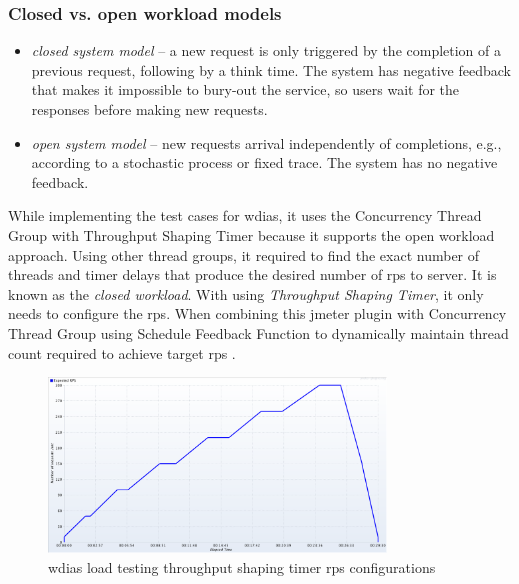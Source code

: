 \subsubsection{Closed vs. open workload models}
\label{subse:closed_vs_open_workload}
\begin{itemize}
    \item \emph{closed system model} \cite{Haggett1998AnWales} -- a new request is only triggered by the completion of a previous request, following by a think time. The system has negative feedback that makes it impossible to bury-out the service, so users wait for the responses before making new requests.
    \item \emph{open system model} -- new requests arrival independently of completions, e.g., according to a stochastic process or fixed trace. The system has no negative feedback.
\end{itemize}
While implementing the test cases for \acrshort{wdias}, it uses the Concurrency Thread Group with Throughput Shaping Timer because it supports the open workload approach.
Using other thread groups, it required to find the exact number of threads and timer delays that produce the desired number of \acrfull{rps} to server. It is known as the \emph{closed workload}.
With using \emph{Throughput Shaping Timer}, it only needs to configure the \acrshort{rps}. When combining this \acrshort{jmeter} plugin with Concurrency Thread Group using Schedule Feedback Function to dynamically maintain thread count required to achieve target \acrshort{rps} \cite{KarunarathneGihanWdias/wdias-performance-test:JMeter.}.

\begin{figure}[htp]
    \centering
    \includegraphics[width=0.8\textwidth]{results/work_load/test_prod_throughtput_shaping_timer.png}
    \caption{\acrshort{wdias} load testing throughput shaping timer \acrshort{rps} configurations}
    \label{fi:test_prod_throughtput_shaping_timer}
\end{figure}

